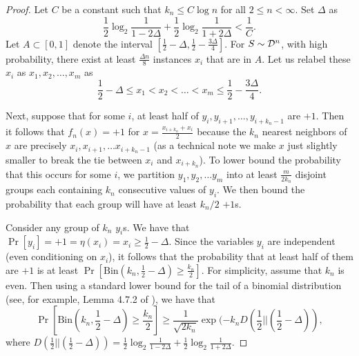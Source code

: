 \begin{proof}
Let $C$ be a constant such that $k_n \leq C\log n$ for all $2 \leq n < \infty$. Set $\Delta$ as \begin{equation}\label{eqn:kl}\frac{1}{2}\log_2\frac{1}{1 - 2\Delta} + \frac{1}{2}\log_2\frac{1}{1 + 2\Delta} < \frac{1}{C}.\end{equation} Let $A \subset [0,1]$ denote the interval $[\frac{1}{2} - \Delta, \frac{1}{2} - \frac{3\Delta}{4}]$. For $S \sim {\mathcal D}^n$, with high probability, there exist at least $\frac{\Delta n}{8}$ instances $x_i$ that are in $A$. Let us relabel these $x_i$ as $x_1, x_2, \dots, x_m$ as $$\frac{1}{2} - \Delta \leq x_1 < x_2 < \dots < x_m \leq \frac{1}{2} - \frac{3\Delta}{4}.$$

Next, suppose that for some $i$, at least half of $y_i, y_{i+1}, \dots, y_{i + k_n - 1}$ are $+1$. Then it follows that $f_n(x) = +1$ for $x = \frac{x_{i+k_n} + x_i}{2}$ because the $k_n$ nearest neighbors of $x$ are precisely $x_i, x_{i+1}, \dots x_{i + k_n - 1}$ (as a technical note we make $x$ just slightly smaller to break the tie between $x_i$ and $x_{i + k_n}$). To lower bound the probability that this occurs for some $i$, we partition $y_1, y_2, \dots y_m$ into at least $\frac{m}{2k_n}$ disjoint groups each containing $k_n$ consecutive values of $y_i$. We then bound the probability that each group will have at least $k_n/2$ $+1$s.

Consider any group of $k_n$ $y_i$s. We have that $\Pr[y_i] = +1 = \eta(x_i) = x_i \geq \frac{1}{2} - \Delta$. Since the variables $y_i$ are independent (even conditioning on $x_i$), it follows that the probability that at least half of them are $+1$ is at least  $\Pr[\text{Bin}(k_n, \frac{1}{2} - \Delta) \geq \frac{k_n}{2}].$ For simplicity, assume that $k_n$ is even. Then using a standard lower bound for the tail of a binomial distribution (see, for example, Lemma 4.7.2 of \cite{Ash90}), we have that $$\Pr[\text{Bin}(k_n, \frac{1}{2} - \Delta) \geq \frac{k_n}{2}] \geq \frac{1}{\sqrt{2k_n}}\exp(-k_nD(\frac{1}{2}||(\frac{1}{2} - \Delta)),$$ where $D(\frac{1}{2}||(\frac{1}{2} - \Delta)) =  \frac{1}{2}\log_2\frac{1}{1 - 2\Delta} + \frac{1}{2}\log_2\frac{1}{1 + 2\Delta}$. 


\end{proof}
